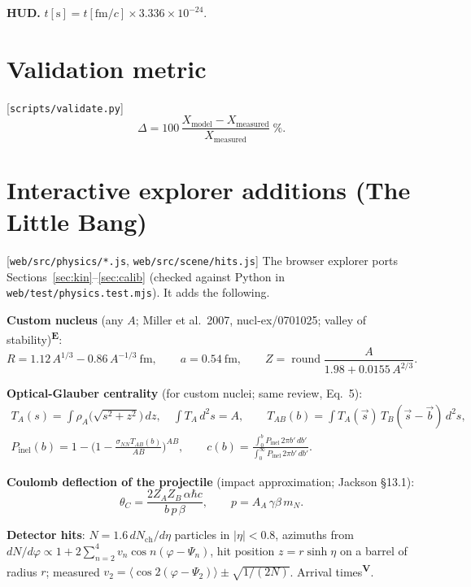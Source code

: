 \documentclass[11pt,a4paper]{article}
\newcommand{\file}[1]{\texttt{\small #1}}
\newcommand{\src}[1]{\hfill{\small\color{gray}[#1]}}
\newcommand{\emp}{\textsuperscript{\color{orange!80!black}\textbf{E}}}
\newcommand{\vis}{\textsuperscript{\color{blue!70!black}\textbf{V}}}
\begin{document}
\textbf{HUD.} $t[\text{s}] = t[\text{fm}/c]\times3.336\times10^{-24}$.

\section{Validation metric}
\src{\file{scripts/validate.py}}
\begin{equation}
\Delta = 100\,\frac{X_\text{model}-X_\text{measured}}{X_\text{measured}}~\%.
\end{equation}

\section{Interactive explorer additions (The Little Bang)}
\src{\file{web/src/physics/*.js}, \file{web/src/scene/hits.js}}
The browser explorer ports Sections~\ref{sec:kin}--\ref{sec:calib} (checked against Python in
\file{web/test/physics.test.mjs}). It adds the following.

\textbf{Custom nucleus} (any $A$; Miller et al.\ 2007, nucl-ex/0701025; valley of stability)\emp:
\begin{equation}
R = 1.12\,A^{1/3} - 0.86\,A^{-1/3}~\text{fm},\qquad a = 0.54~\text{fm},\qquad Z = \operatorname{round}\frac{A}{1.98 + 0.0155\,A^{2/3}}.
\end{equation}

\textbf{Optical-Glauber centrality} (for custom nuclei; same review, Eq.~5):
\begin{gather}
T_A(s) = \int\!\rho_A\big(\sqrt{s^2+z^2}\big)\,dz,\quad \int T_A\,d^2s = A,\qquad
T_{AB}(b) = \int T_A(\vec s)\,T_B(\vec s-\vec b)\,d^2s,\\
P_\text{inel}(b) = 1-\Big(1-\frac{\sigma_{NN}T_{AB}(b)}{AB}\Big)^{AB},\qquad
c(b) = \frac{\int_0^b P_\text{inel}\,2\pi b'\,db'}{\int_0^\infty P_\text{inel}\,2\pi b'\,db'}.
\end{gather}

\textbf{Coulomb deflection of the projectile} (impact approximation; Jackson \S13.1):
\begin{equation}
\theta_C = \frac{2 Z_A Z_B\,\alpha\hbar c}{b\,p\,\beta},\qquad p = A_A\,\gamma\beta\,m_N.
\end{equation}

\textbf{Detector hits}: $N = 1.6\,dN_\text{ch}/d\eta$ particles in $|\eta|<0.8$, azimuths from
$dN/d\varphi \propto 1+2\sum_{n=2}^{4}v_n\cos n(\varphi-\Psi_n)$, hit position $z = r\sinh\eta$ on a barrel of radius $r$;
measured $v_2 = \langle\cos 2(\varphi-\Psi_2)\rangle \pm \sqrt{1/(2N)}$. Arrival times\vis.
\end{document}
